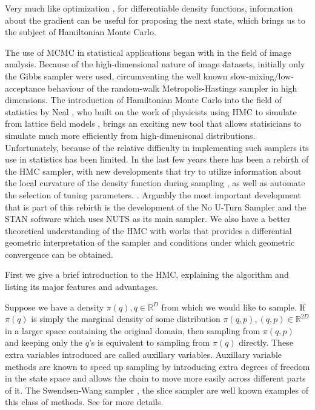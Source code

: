 \documentclass[12pt]{report}
\begin{document}
Very much like optimization \cite{wright1999numerical}, for differentiable density
functions, information about the gradient can be useful for proposing the next
state, which brings us to the subject of Hamiltonian Monte Carlo.


The use of MCMC in statistical applications began with \cite{geman1984stochastic,besag1986statistical} in the field of image analysis. Because of the high-dimensional nature of image datasets, initially only the Gibbs sampler were used, circumventing the well known slow-mixing/low-acceptance behaviour of the random-walk Metropolis-Hastings sampler in high dimensions. The introduction of Hamiltonian Monte Carlo into the field of statistics by Neal \cite{neal2011mcmc,neal2012bayesian}, who built on the work of physicists using HMC to simulate from lattice field models \cite{duane1987hybrid}, brings an exciting new tool that allows statisicians to simulate much more efficiently from high-dimenisonal distributions. Unfortunately, because of the relative difficulty in implementing such samplers its use in statistics has been limited. In the last few years there has been a rebirth of the HMC sampler, with new developments that try to utilize information about the local curvature of the density function during  sampling \cite{girolami2011riemann,betancourt2013general}, as well as  automate the selection of tuning parameters.  \cite{hoffman2014no,betancourt2016identifying}. 
Arguably the most important development that is part of this rebirth is the development of the No U-Turn Sampler and the STAN software which uses NUTS as its main sampler. We also have a better theoretical understanding of the HMC with works \cite{betancourt2014geometric,livingstone2016geometric}
that provides a differential geometric interpretation of the sampler and conditions under which geometric convergence can be obtained.

First we give a brief introduction to the HMC, explaining the algorithm and listing its major features and advantages. 

Suppose we have a density $\pi(q),q \in \mathbb{R}^D$ from which we would like to
sample. If $\pi(q)$ is simply the marginal density of some distribution $\pi(q,p),
(q,p) \in \mathbb{R}^{2D}$ in a larger space containing the original domain, then sampling from $\pi(q,p)$ and keeping only the $q$'s is equivalent to sampling from $\pi(q)$ directly. These extra variables introduced are called auxillary variables. Auxillary variable methods are known to speed up sampling by introducing extra degrees of freedom in the state space and allows the chain to move more easily across different parts of it. The Swendsen-Wang sampler \cite{wang1990cluster}, the slice sampler\cite{wang1990cluster} are well known examples of this class of methods. See \cite{liang2011advanced,liu2008monte} for more details.
\end{document}
